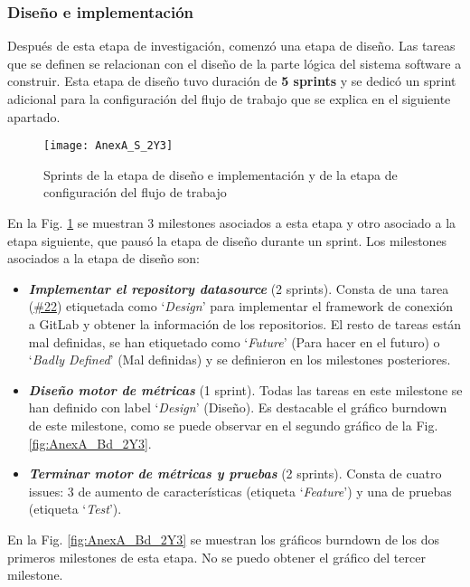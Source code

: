 \subsubsection{Diseño e implementación}

Después de esta etapa de investigación, comenzó una etapa de diseño. Las tareas que se definen se relacionan con el diseño de la parte lógica del sistema software a construir. Esta etapa de diseño tuvo duración de \textbf{5 sprints} y se dedicó un sprint adicional para la configuración del flujo de trabajo que se explica en el siguiente apartado.

\begin{figure}[!h]
	\centering
	\texttt{[image: AnexA\_S\_2Y3]}
	\caption{Sprints de la etapa de diseño e implementación y de la etapa de configuración del flujo de trabajo}
	\label{fig:AnexA_S_2Y3}
\end{figure}
\FloatBarrier

En la Fig. \ref{fig:AnexA_S_2Y3} se muestran 3 milestones asociados a esta etapa y otro asociado a la etapa siguiente, que pausó la etapa de diseño durante un sprint.
Los milestones asociados a la etapa de diseño son:
\begin{itemize}
	\item \textbf{\textit{Implementar el repository datasource}} (2 sprints). Consta de una tarea (\href{https://gitlab.com/mlb0029/comparador-de-metricas-de-evolucion-en-repositorios-software/issues/22}{\#22}) etiquetada como `\textit{Design}' para implementar el framework de conexión a GitLab y obtener la información de los repositorios. El resto de tareas están mal definidas, se han etiquetado como `\textit{Future}' (Para hacer en el futuro) o `\textit{Badly Defined}' (Mal definidas) y se definieron en los milestones posteriores.
	
	\item \textbf{\textit{Diseño motor de métricas}} (1 sprint). Todas las tareas en este milestone se han definido con label `\textit{Design}' (Diseño). Es destacable el gráfico burndown de este milestone, como se puede observar en el segundo gráfico de la Fig. \ref{fig:AnexA_Bd_2Y3}.
	
	\item \textbf{\textit{Terminar motor de métricas y pruebas}} (2 sprints). Consta de cuatro issues: 3 de aumento de características (etiqueta `\textit{Feature}') y una de pruebas (etiqueta `\textit{Test}').
\end{itemize}

En la Fig. \ref{fig:AnexA_Bd_2Y3} se muestran los gráficos burndown de los dos primeros milestones de esta etapa. No se puedo obtener el gráfico del tercer milestone.

